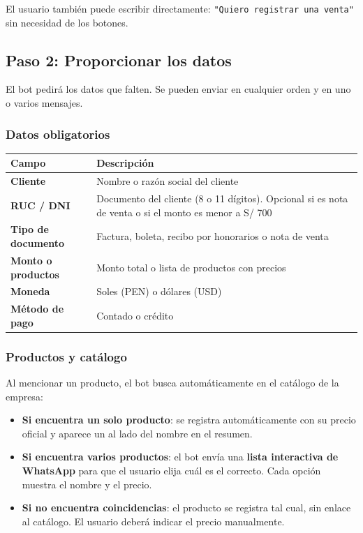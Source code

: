 \documentclass[12pt,a4paper]{article}
\begin{document}
El usuario tambi\'en puede escribir directamente: \texttt{"Quiero registrar una venta"} sin necesidad de los botones.

\subsection{Paso 2: Proporcionar los datos}

El bot pedir\'a los datos que falten. Se pueden enviar en cualquier orden y en uno o varios mensajes.

\subsubsection{Datos obligatorios}

\begin{center}
\begin{tabular}{>{\bfseries}l p{8cm}}
\toprule
Campo & Descripci\'on \\
\midrule
Cliente & Nombre o raz\'on social del cliente \\
RUC / DNI & Documento del cliente (8 o 11 d\'igitos). Opcional si es nota de venta o si el monto es menor a S/ 700 \\
Tipo de documento & Factura, boleta, recibo por honorarios o nota de venta \\
Monto o productos & Monto total o lista de productos con precios \\
Moneda & Soles (PEN) o d\'olares (USD) \\
M\'etodo de pago & Contado o cr\'edito \\
\bottomrule
\end{tabular}
\end{center}

\subsubsection{Productos y cat\'alogo}

Al mencionar un producto, el bot busca autom\'aticamente en el cat\'alogo de la empresa:

\begin{itemize}
    \item \textbf{Si encuentra un solo producto}: se registra autom\'aticamente con su precio oficial y aparece un \checkmark{} al lado del nombre en el resumen.
    \item \textbf{Si encuentra varios productos}: el bot env\'ia una \textbf{lista interactiva de WhatsApp} para que el usuario elija cu\'al es el correcto. Cada opci\'on muestra el nombre y el precio.
    \item \textbf{Si no encuentra coincidencias}: el producto se registra tal cual, sin enlace al cat\'alogo. El usuario deber\'a indicar el precio manualmente.
\end{itemize}
\end{document}
